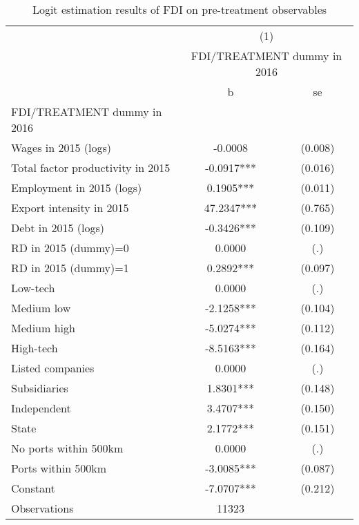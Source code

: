 \begin{table}[htbp]\centering
\def\sym#1{\ifmmode^{#1}\else\(^{#1}\)\fi}
\caption{Logit estimation results of FDI on pre-treatment observables \label{selection\_logit}}
\begin{tabular}{l*{1}{cc}}
\hline\hline
                &\multicolumn{2}{c}{(1)}\\
                &\multicolumn{2}{c}{FDI/TREATMENT dummy in 2016}\\
                &        b   &       se\\
\hline
FDI/TREATMENT dummy in 2016&            &         \\
Wages in 2015 (logs)&  -0.0008   &  (0.008)\\
Total factor productivity in 2015&  -0.0917***&  (0.016)\\
Employment in 2015 (logs)&   0.1905***&  (0.011)\\
Export intensity in 2015&  47.2347***&  (0.765)\\
Debt in 2015 (logs)&  -0.3426***&  (0.109)\\
RD in 2015 (dummy)=0&   0.0000   &      (.)\\
RD in 2015 (dummy)=1&   0.2892***&  (0.097)\\
Low-tech        &   0.0000   &      (.)\\
Medium low      &  -2.1258***&  (0.104)\\
Medium high     &  -5.0274***&  (0.112)\\
High-tech       &  -8.5163***&  (0.164)\\
 Listed companies&   0.0000   &      (.)\\
 Subsidiaries   &   1.8301***&  (0.148)\\
 Independent    &   3.4707***&  (0.150)\\
 State          &   2.1772***&  (0.151)\\
No ports within 500km&   0.0000   &      (.)\\
Ports within 500km&  -3.0085***&  (0.087)\\
Constant        &  -7.0707***&  (0.212)\\
\hline
Observations    &    11323   &         \\
\hline\hline
\end{tabular}
\end{table}
